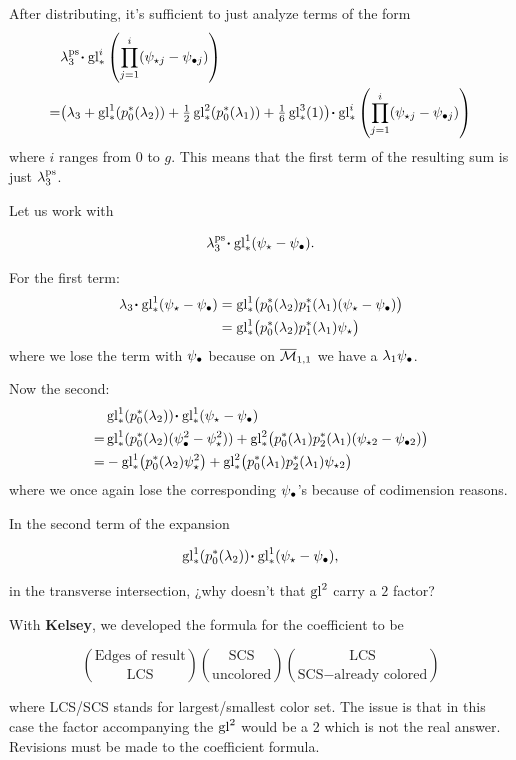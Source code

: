 \documentclass[12pt]{memoir}
\begin{document}
After distributing, it's sufficient to just analyze terms of the form
\begin{align*}
      & \la_3^{\ps}\.\glu_\ast^i\left(\prod_{j=1}^i(\psi_{\star j}-\psi_{\8j})\right)                                                                                                        \\
    = & \bigl(\la_3+\glu^1_\ast(p_0^\ast(\la_2))+\tfrac{1}{2}\glu^2_\ast(p_0^\ast(\la_1))+\tfrac{1}{6}\glu^3_\ast(1)\bigr)\.\glu_\ast^i\left(\prod_{j=1}^i(\psi_{\star j}-\psi_{\8j})\right)
\end{align*}
where \(i\) ranges from \(0\) to \(g\). This means that the first term of the resulting sum is just \(\lambda_3^{\operatorname{\mathrm{ps}}}\).\par
Let us work with

\[\la_3^{\ps}\.\glu_\ast^1(\psi_\star-\psi_\8).\]


\begin{ptcb}
    For the first term:
    \begin{align*}
        \la_3\.\glu_\ast^1(\psi_\star-\psi_\8) & =\glu_\ast^1\bigl(p_0^\ast(\la_2)p_1^\ast(\la_1)(\psi_\star-\psi_\8)\bigr) \\
                                               & =\glu_\ast^1\bigl(p_0^\ast(\la_2)p_1^\ast(\la_1)\psi_\star\bigr)
    \end{align*}
    where we lose the term with \(\psi_\bullet\) because on \(\overline{\mathcal{M}}_{1,1}\) we have a \(\lambda_1\psi_\bullet\).\par
    Now the second:
    \begin{align*}
          & \glu_\ast^1(p_0^\ast(\la_2))\.\glu_\ast^1(\psi_\star-\psi_\8)                                                                        \\
        = & \glu_\ast^1(p_0^\ast(\la_2)(\psi_\8^2-\psi_\star^2))+\glu_\ast^2\bigl(p_0^\ast(\la_1)p_2^\ast(\la_1)(\psi_{\star2}-\psi_{\82})\bigr) \\
        = & -\glu_\ast^1\bigl(p_0^\ast(\la_2)\psi_\star^2\bigr)+\glu_\ast^2\bigl(p_0^\ast(\la_1)p_2^\ast(\la_1)\psi_{\star2}\bigr)
    \end{align*}
    where we once again lose the corresponding \(\psi_\bullet\)'s because of codimension reasons.
\end{ptcb}

\begin{Qn}
    In the second term of the expansion

    \[\glu_\ast^1(p_0^\ast(\la_2))\.\glu_\ast^1(\psi_\star-\psi_\8),\]

    in the transverse intersection, ¿why doesn't that \(\operatorname{gl}^2\) carry a \(2\) factor?\par
    With \textbf{Kelsey}, we developed the formula for the coefficient to be

    \[\binom{\text{Edges of result}}{\text{LCS}}\binom{\text{SCS}}{\text{uncolored}}\binom{\text{LCS}}{\text{SCS}-\text{already colored}}\]

    where LCS/SCS stands for largest/smallest color set. The issue is that in this case the factor accompanying the \(\operatorname{gl}^2\) would be a 2 which is not the real answer. Revisions must be made to the coefficient formula.
\end{Qn}
\end{document}
